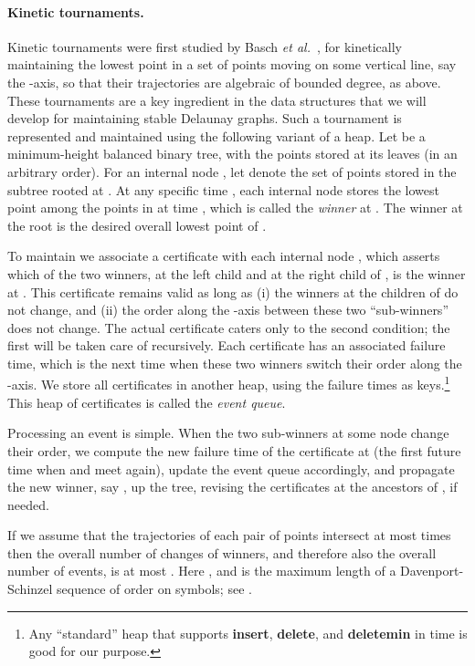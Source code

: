 \documentclass[letter,11pt]{article}
\begin{document}
\paragraph{Kinetic tournaments.} 
Kinetic tournaments were first studied by
Basch \textit{et al.}~\cite{bgh-dsmd-99}, for kinetically maintaining the lowest point in a set  of  points moving on some vertical line, say the -axis, so that their trajectories are algebraic of bounded degree, as above. 
These tournaments are a key ingredient in the data structures that we will develop for maintaining stable Delaunay graphs. Such a tournament is 
represented and maintained using the following variant of a heap.
Let  be a minimum-height balanced binary tree, with the points stored
at its leaves (in an arbitrary order). For an internal node ,
let  denote the set of points stored in the subtree rooted at . At any
specific time , each internal node  stores the lowest point
among the points in  at time , which is called the {\em winner\/} at .
The winner at the root is the desired overall lowest point of .

To maintain  we associate a certificate with each internal node , which
asserts which of the two winners, at the left child and at the
right child of , is the winner at . This certificate remains
valid as long as (i) the winners at the children of  do not change,
and (ii) the order along the -axis between these two
``sub-winners'' does not change. The actual certificate caters
only to the second
condition; the first will be taken care of recursively.
Each certificate has an associated failure time, which is the next time
when these two winners switch their order along the -axis.
We store all certificates in another heap, using the failure times
as keys.\footnote{Any ``standard'' heap that supports
  {\bf insert}, {\bf delete}, and {\bf deletemin} in 
  time is good for our purpose.}
This heap of certificates is called the {\em event queue}.


Processing an event is simple. When the two sub-winners  at some node  change their order, we compute the new failure time of the certificate at  (the first future time when  and  meet again), update the event queue accordingly, and propagate the new winner, say , up the tree, revising the certificates at the ancestors of , if needed.

If we assume that the  trajectories of each pair of points intersect at most 
times then
the overall number of changes of winners, and
therefore also the overall number of events, is at most
. Here
, and  is the maximum length of a Davenport-Schinzel sequence
of order  on  symbols; see \cite{SA95}.
\end{document}
